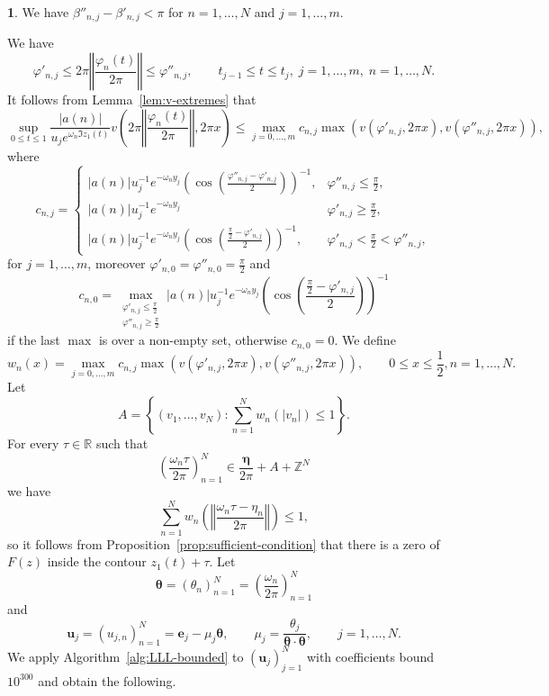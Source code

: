 \documentclass[oneside,english]{amsart}
\numberwithin{equation}{section}
\numberwithin{figure}{section}
\theoremstyle{plain}
\theoremstyle{plain}
\theoremstyle{plain}
\theoremstyle{definition}
\newtheorem{claim}{\protect\claimname}
\providecommand{\claimname}{Claim}
\begin{document}
\begin{claim}
We have $\beta''_{n,j}-\beta'_{n,j}<\pi$ for $n=1,\dotsc,N$ and
$j=1,\dotsc,m$.
\end{claim}
We have
\[
\varphi'_{n,j}\leq2\pi\left\Vert \frac{\varphi_{n}(t)}{2\pi}\right\Vert \leq\varphi''_{n,j},\qquad t_{j-1}\leq t\leq t_{j},\;j=1,\dotsc,m,\;n=1,\dotsc,N.
\]
It follows from Lemma~\ref{lem:v-extremes} that
\[
\sup_{0\leq t\leq1}\frac{\left|a(n)\right|}{u_{j}e^{\omega_{n}\Im z_{1}(t)}}v\left(2\pi\left\Vert \frac{\varphi_{n}(t)}{2\pi}\right\Vert ,2\pi x\right)\leq\max_{j=0,\dotsc,m}c_{n,j}\max\left(v\left(\varphi'_{n,j},2\pi x\right),v\left(\varphi''_{n,j},2\pi x\right)\right),
\]
where
\[
c_{n,j}=\begin{cases}
\left|a(n)\right|u_{j}^{-1}e^{-\omega_{n}y_{j}}\left(\cos\left(\frac{\varphi''_{n,j}-\varphi'_{n,j}}{2}\right)\right)^{-1}, & \varphi''_{n,j}\leq\frac{\pi}{2},\\
\left|a(n)\right|u_{j}^{-1}e^{-\omega_{n}y_{j}} & \varphi'_{n,j}\geq\frac{\pi}{2},\\
\left|a(n)\right|u_{j}^{-1}e^{-\omega_{n}y_{j}}\left(\cos\left(\frac{\frac{\pi}{2}-\varphi'_{n,j}}{2}\right)\right)^{-1}, & \varphi'_{n,j}<\frac{\pi}{2}<\varphi''_{n,j},
\end{cases}
\]
for $j=1,\dotsc,m$, moreover $\varphi'_{n,0}=\varphi''_{n,0}=\frac{\pi}{2}$
and
\[
c_{n,0}=\max_{\substack{\varphi'_{n,j}\leq\frac{\pi}{2}\\
\varphi''_{n,j}\geq\frac{\pi}{2}
}
}\left|a(n)\right|u_{j}^{-1}e^{-\omega_{n}y_{j}}\left(\cos\left(\frac{\frac{\pi}{2}-\varphi'_{n,j}}{2}\right)\right)^{-1}
\]
if the last $\max$ is over a non-empty set, otherwise $c_{n,0}=0$.
We define
\[
w_{n}(x)=\max_{j=0,\dotsc,m}c_{n,j}\max\left(v\left(\varphi'_{n,j},2\pi x\right),v\left(\varphi''_{n,j},2\pi x\right)\right),\qquad0\leq x\leq\frac{1}{2},n=1,\dotsc,N.
\]
Let
\[
A=\left\{ (v_{1},\dotsc,v_{N}):\sum_{n=1}^{N}w_{n}\left(\left|v_{n}\right|\right)\leq1\right\} .
\]
For every $\tau\in\mathbb{R}$ such that 
\[
\left(\frac{\omega_{n}\tau}{2\pi}\right)_{n=1}^{N}\in\frac{\boldsymbol{\eta}}{2\pi}+A+\mathbb{Z}^{N}
\]
we have
\[
\sum_{n=1}^{N}w_{n}\left(\left\Vert \frac{\omega_{n}\tau-\eta_{n}}{2\pi}\right\Vert \right)\leq1,
\]
so it follows from Proposition~\ref{prop:sufficient-condition} that
there is a zero of $F(z)$ inside the contour $z_{1}(t)+\tau$. Let
\[
\boldsymbol{\theta}=(\theta_{n})_{n=1}^{N}=\left(\frac{\omega_{n}}{2\pi}\right)_{n=1}^{N}
\]
and
\[
\boldsymbol{u}_{j}=\left(u_{j,n}\right)_{n=1}^{N}=\boldsymbol{e}_{j}-\mu_{j}\boldsymbol{\theta},\qquad\mu_{j}=\frac{\theta_{j}}{\boldsymbol{\theta}\cdot\boldsymbol{\theta}},\qquad j=1,\dotsc,N.
\]
We apply Algorithm~\ref{alg:LLL-bounded} to $\left(\boldsymbol{u}_{j}\right)_{j=1}^{N}$
with coefficients bound $10^{300}$ and obtain the following.
\end{document}
